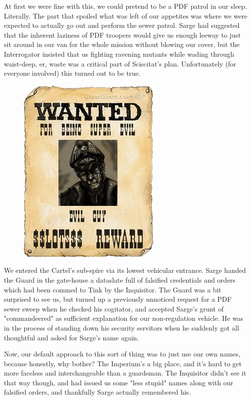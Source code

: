 At first we were fine with this, we could pretend to be a PDF patrol in our sleep. 
Literally. 
The part that spoiled what was left of our appetites was where we were expected to actually go out and perform the sewer patrol. 
Sarge had suggested that the inherent laziness of PDF troopers would give us enough leeway to just sit around in our van for the whole mission without blowing our cover, but the Interrogator insisted that us fighting ravening mutants while wading through waist-deep, er, waste was a critical part of Sciscitat's plan. 
Unfortunately (for everyone involved) this turned out to be true.

\begin{figure}
	\begin{center}
		\includegraphics[width=\figwidth]{pics/18/2.png}
	\end{center}
\end{figure}
We entered the Cartel's sub-spire via its lowest vehicular entrance. 
Sarge handed the Guard in the gate-house a dataslate full of falsified credentials and orders which had been commed to Tink by the Inquisitor. 
The Guard was a bit surprised to see us, but turned up a previously unnoticed request for a PDF sewer sweep when he checked his cogitator, and accepted Sarge's grunt of "commandeered" as sufficient explanation for our non-regulation vehicle. 
He was in the process of standing down his security servitors when he suddenly got all thoughtful and asked for Sarge's name again. 


Now, our default approach to this sort of thing was to just use our own names, because honestly, why bother? 
The Imperium's a big place, and it's hard to get more faceless and interchangeable than a guardsman. 
The Inquisitor didn't see it that way though, and had issued us some "less stupid" names along with our falsified orders, and thankfully Sarge actually remembered his. 


